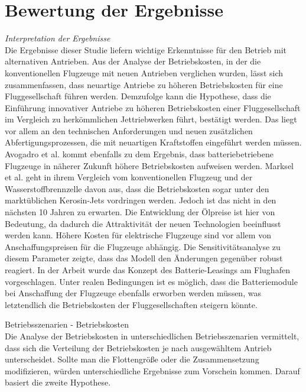 
\section{Bewertung der Ergebnisse}
\label{s:Bewertung der Ergebnisse}

\textit{Interpretation der Ergebnisse}\\
Die Ergebnisse dieser Studie liefern wichtige Erkenntnisse für den Betrieb mit alternativen Antrieben.
Aus der Analyse der Betriebskosten, in der die konventionellen Flugzeuge mit neuen Antrieben verglichen wurden, 
lässt sich zusammenfassen, dass neuartige Antriebe zu höheren Betriebskosten für eine Fluggesellschaft führen werden.
Demzufolge kann die Hypothese, dass die Einführung innovativer Antriebe zu höheren 
Betriebskosten einer Fluggesellschaft im Vergleich zu herkömmlichen Jettriebwerken führt, bestätigt werden. 
Das liegt vor allem an den technischen Anforderungen und neuen zusätzlichen Abfertigungsprozessen, 
die mit neuartigen Kraftstoffen eingeführt werden müssen. 
Avogadro et al.\cite{avogadro2024demystifying} kommt ebenfalls zu dem Ergebnis, 
dass batteriebetriebene Flugzeuge in näherer Zukunft höhere Betriebskosten aufweisen werden. 
Marksel et al. \cite{marksel2023comparative} geht in ihrem Vergleich vom konventionellen Flugzeug und der Wasserstoffbrennzelle davon aus, 
dass die Betriebskosten sogar unter den marktüblichen Kerosin-Jets vordringen werden. 
Jedoch ist das nicht in den nächsten 10 Jahren zu erwarten. 
Die Entwicklung der Ölpreise ist hier von Bedeutung, 
da dadurch die Attraktivität der neuen Technologien beeinflusst werden kann.
%
Höhere Kosten für elektrische Flugzeuge sind vor allem von Anschaffungspreisen für die Flugzeuge abhängig. 
Die Sensitivitätsanalyse zu diesem Parameter zeigte, dass das Modell den Änderungen gegenüber robust reagiert.
In der Arbeit wurde das Konzept des Batterie-Leasings am Flughafen vorgeschlagen. 
Unter realen Bedingungen ist es möglich, dass die Batteriemodule bei Anschaffung 
der Flugzeuge ebenfalls erworben werden müssen, 
was letztendlich die Betriebskosten der Fluggesellschaften steigern könnte. 


Betriebsszenarien - Betriebskosten\\
Die Analyse der Betriebskosten in unterschiedlichen Betriebsszenarien vermittelt, 
dass sich die Verteilung der Betriebskosten je nach ausgewähltem Antrieb unterscheidet. 
Sollte man die Flottengröße oder die Zusammensetzung modifizieren, 
würden unterschiedliche Ergebnisse zum Vorschein kommen.
Darauf basiert die zweite Hypothese. 

